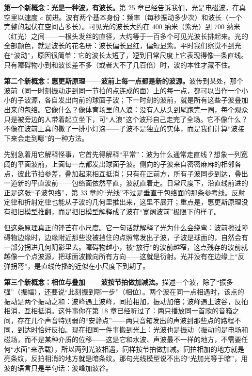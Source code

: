 \begin{mainline}
\textbf{第一个新概念：光是一种波，有波长。}第 25 章已经告诉我们，光是电磁波，在真空里以速度 \(c\) 前进。波有两个基本身份：频率（每秒振动多少次）和波长（一个完整的起伏在空间占多长）。可见光的波长大约在 \(400\) 纳米（紫光）到 \(700\) 纳米（红光）之间——一根头发丝的直径，大约等于一百多个可见光波长排起来。光的全部颜色，就是波长的花名册：波长偏长显红，偏短显紫。平时我们察觉不到光在“波动”，原因很简单：它的波长太短了，短到日常尺度上它表现得像一条直线。只有障碍物小到和波长差不多（或者大不了几百倍）时，波的本性才藏不住。

\textbf{第二个新概念：惠更斯原理——波前上每一点都是新的波源。}波传到某处，那个波前（同一时刻振动走到同一节拍的点连成的面）上的每一点，都可以当作一个小小的子波源，各自发出向前的球面子波；下一时刻的波前，就是所有这些子波叠加出来的包络。它像什么？像体育场里的人浪：没有人从头到尾跑完一圈，每个观众只是被旁边的人带着起立坐下，可“人浪”这个波形自己走完了全场。它不像什么？不像在波前上真的撒了一排小灯泡——子波不是独立的实体，而是我们计算“波接下来会走到哪”的一种方法。

先别急着用它解释怪事，它首先得解释“平常”：波为什么通常走直线？想象一列宽阔的平面波前，上面每一点都发出球面子波。侧向的子波来自密密麻麻的相邻各点，彼此节拍参差，叠加起来相互抵消；只有在正前方，所有子波同步到达，叠出一道新的平直波前——包络面依然平直，波就直着走。日常尺度下，沿直线前进的正是这张“子波包络”，第 33 章的“光线”不过是垂直于包络面的那条参考线。反射定律和折射定律也能从子波的几何里推出来，这里不展开；重点是，惠更斯原理没有把旧模型推翻，而是把旧模型解释成了波在“宽阔波前”极限下的样子。

但这条原理真正的锋芒在小尺度。它一句话就解释了光为什么会绕弯：波前擦过障碍物边缘时，边缘附近那些没被挡住的点照常发出子波，子波是球面的，自然会有一部分拐进几何阴影里去。障碍物越小，被“放行”的波前越窄，这点残存的波前就越像一个点波源，把球面波撒向所有方向——这就是衍射。光并没有在边缘上“反弹拐弯”，是直线传播的近似在小尺度下到期了。

\textbf{第三个新概念：相位与叠加——波按节拍做加减法。}描述一个波，除了“振多强”（振幅），还要说“此刻振到哪一步”（相位）。两个波在同一点相遇时，该点的振动是两个振动之和：波峰遇上波峰，同拍相加，振动加倍；波峰遇上波谷，反拍相消，互相抵消。这件事你在第 18 章已经听过了：两只播放同一首歌的音箱之间，存在几个声音特别弱的“安静点”——两只音箱发出的声波到那些点的路程不同，到达时恰好反拍。现在把同一件事搬到光上：光波也是振动（振动的是电场和磁场，而不是某种介质的位移——这是它和水波、声波最不一样的地方，不需要任何“水面”来承载），所以两列光波相遇，同样按节拍做加减。同拍相加的地方就是亮条纹，反拍相消的地方就是暗条纹。那句光线模型说不出的“光加光等于暗”，用波的语言只是半句话：波峰加波谷。
\end{mainline}

